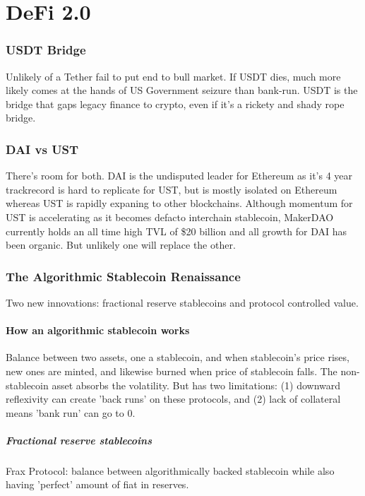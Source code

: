 \documentclass{../notes}
\begin{document}
\part{DeFi 2.0}
\section{USDT Bridge}
Unlikely of a Tether fail to put end to bull market. If USDT dies, much more likely comes at the hands of US Government seizure than bank-run. USDT is the bridge that gaps legacy finance to crypto, even if it's a rickety and shady rope bridge. 

\section{DAI vs UST}
There's room for both. DAI is the undisputed leader for Ethereum as it's 4 year trackrecord is hard to replicate for UST, but is mostly isolated on Ethereum whereas UST is rapidly expaning to other blockchains. Although momentum for UST is accelerating as it becomes defacto interchain stablecoin, MakerDAO currently holds an all time high TVL of \$20 billion and all growth for DAI has been organic. But unlikely one will replace the other. 

\section{The Algorithmic Stablecoin Renaissance}
Two new innovations: fractional reserve stablecoins and protocol controlled value.

\subsection{How an algorithmic stablecoin works}
Balance between two assets, one a stablecoin, and when stablecoin's price rises, new ones are minted, and likewise burned when price of stablecoin falls. The non-stablecoin asset absorbs the volatility. But has two limitations: (1) downward reflexivity can create 'back runs' on these protocols, and (2) lack of collateral means 'bank run' can go to 0. 

\subsubsection{Fractional reserve stablecoins}
Frax Protocol: balance between algorithmically backed stablecoin while also having 'perfect' amount of fiat in reserves. 
\end{document}
